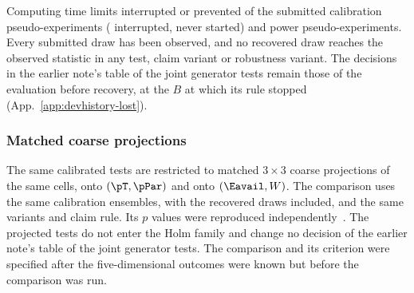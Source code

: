 Computing time limits interrupted or prevented \jtLostCal{} of the submitted calibration pseudo-experiments (\jtLostInterrupted{} interrupted, \jtLostNever{} never started) and \jtLostPow{} power pseudo-experiments. Every submitted draw has been observed, and no recovered draw reaches the observed statistic in any test, claim variant or robustness variant. The decisions in the earlier note's table of the joint generator tests remain those of the evaluation before recovery, at the $B$ at which its rule stopped (App.~\ref{app:devhistory-lost}).

\subsubsection{Matched coarse projections}

The same calibrated tests are restricted to matched $3\times3$ coarse projections of the same cells, onto $(\pT,\pPar)$ and onto $(\Eavail,W)$. The comparison uses the same calibration ensembles, with the recovered draws included, and the same variants and claim rule. Its $p$ values were reproduced independently~\cite{JointTestProjections2026}. The projected tests do not enter the Holm family and change no decision of the earlier note's table of the joint generator tests. The comparison and its criterion were specified after the five-dimensional outcomes were known but before the comparison was run.

